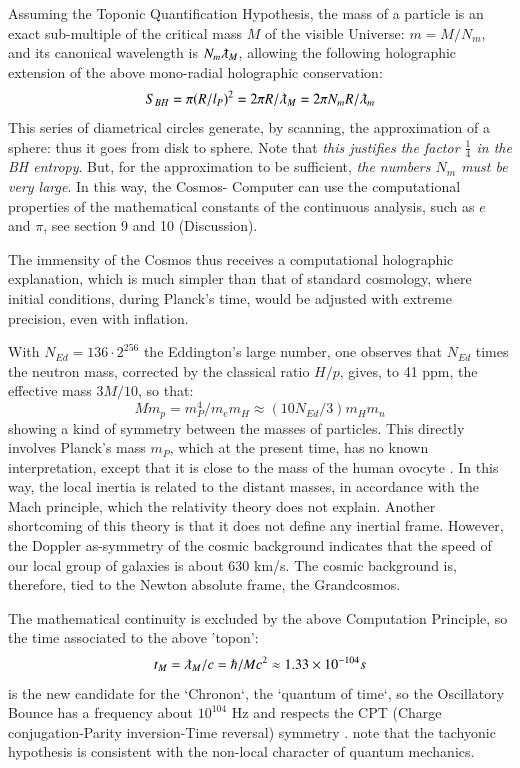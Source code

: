 \documentclass[twoside,draft]{article}
\begin{document}
\begin{sloppypar}
Assuming the Toponic Quantification Hypothesis, the mass of a particle is an exact sub-multiple 
of the critical  mass $M$ of the visible Universe: $m = M/N_{m}$, and its canonical wavelength is 
$N_m \lambdabar_{M}$, allowing the following holographic extension of the above mono-radial holographic conservation:
\begin{equation}
S_{BH} = \pi(R/l_{P})^{2} = 2\pi R/\lambdabar_{M} = 2\pi N_{m} R/\lambdabar_{m}
\end{equation}
This series of diametrical circles generate, by scanning, the approximation of a sphere: thus it goes 
from disk to sphere. Note that \textit{this justifies the factor $\frac{1}{4}$ in the BH entropy}. 
But, for the approximation to be sufficient, \textit{the numbers $N_{m}$ must be very large}. In this way, the Cosmos-
Computer can use the computational properties of the mathematical constants of the continuous analysis, such as $e$ and $\pi$, see section 9 and 10 (Discussion).

The immensity of the Cosmos thus receives a computational holographic explanation, which is much simpler than that of standard cosmology, where initial conditions, during Planck's time, would be adjusted with extreme precision, even with inflation. 

With $N_{Ed} = 136 \cdot2^{256}$ the Eddington's large number, one observes that $N_{Ed}$ times the neutron mass, corrected by the classical ratio $H/p$, gives, to 41 ppm, the effective mass $3M/10$, so that:
\begin{equation}
Mm_p = m_P^4/m_em_H\approx(10N_{Ed}/3)m_Hm_n 
\end{equation}
showing a kind of symmetry between the masses of particles. This directly involves Planck's mass $m_{P}$, which at the present time, has no known interpretation, except that it is close to the mass of the human ovocyte \cite{Sanchez1}. In this way, the local inertia is related to the distant masses, in accordance with the Mach principle, which the relativity theory does not explain. Another shortcoming of this theory is that it does not define any inertial frame. However, the Doppler as-symmetry of the cosmic background indicates that the speed of our local group of galaxies is about 630 km/s. The cosmic background is, therefore, tied to the Newton absolute frame, the Grandcosmos.

The mathematical continuity is excluded by the above Computation Principle, so the time associated to the above 'topon': 
\begin{equation}
t_M = \lambdabar_{M} /c = \hbar/Mc^2 \approx 1.33 \times 10^{-104}s 
\end{equation}
is the new candidate for the `Chronon`, the `quantum of time`, so the Oscillatory Bounce has a frequency about $10^{104}$ Hz  \cite{Sanchez2} and respects the CPT (Charge conjugation-Parity inversion-Time reversal) symmetry \cite{Sanchez1}. note that the tachyonic hypothesis is consistent with the non-local character of quantum mechanics.


\end{sloppypar}
\end{document}
